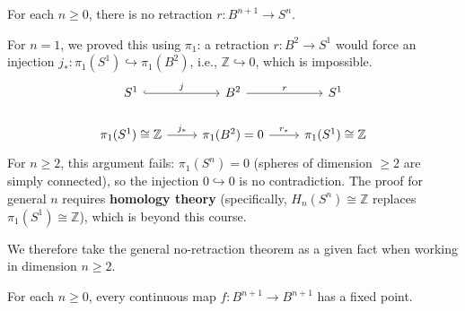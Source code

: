 \documentclass[11pt]{report}
\begin{document}
\begin{thmbox}
For each $n \geq 0$, there is no retraction $r: B^{n+1} \to S^n$.
\end{thmbox}

\begin{rembox}
For $n = 1$, we proved this using $\pi_1$: a retraction $r: B^2 \to S^1$ would force an injection $j_*: \pi_1(S^1) \hookrightarrow \pi_1(B^2)$, i.e., $\mathbb{Z} \hookrightarrow 0$, which is impossible.
\[
\begin{tikzcd}
S^1 \arrow[r, hookrightarrow, "j"] & B^2 \arrow[r, "r"] & S^1 \\
\pi_1(S^1) \cong \mathbb{Z} \arrow[r, "j_*"] & \pi_1(B^2) = 0 \arrow[r, "r_*"] & \pi_1(S^1) \cong \mathbb{Z}
\end{tikzcd}
\]
For $n \geq 2$, this argument fails: $\pi_1(S^n) = 0$ (spheres of dimension $\geq 2$ are simply connected), so the injection $0 \hookrightarrow 0$ is no contradiction. The proof for general $n$ requires \textbf{homology theory} (specifically, $H_n(S^n) \cong \mathbb{Z}$ replaces $\pi_1(S^1) \cong \mathbb{Z}$), which is beyond this course.

We therefore take the general no-retraction theorem as a given fact when working in dimension $n \geq 2$.
\end{rembox}

\begin{thmbox}
For each $n \geq 0$, every continuous map $f: B^{n+1} \to B^{n+1}$ has a fixed point.
\end{thmbox}
\end{document}
